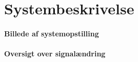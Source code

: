 \chapter{Systembeskrivelse}
\subsubsection{Billede af systemopstilling}
\subsubsection{Oversigt over signalændring}
